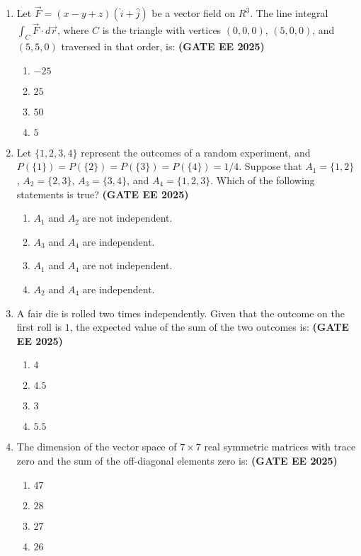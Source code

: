 \documentclass[journal,12pt,onecolumn]{IEEEtran}
\theoremstyle{remark}
\begin{document}
\begin{enumerate}
\item Let $\vec{F} = (x - y + z)(\hat{i} + \hat{j})$ be a vector field on  ${R}^3$. The line integral $\displaystyle \int_C \vec{F} \cdot d\vec{r}$, where $C$ is the triangle with vertices $(0,0,0)$, $(5,0,0)$, and $(5,5,0)$ traversed in that order, is:
\hfill \textbf{(GATE EE 2025)}\\
\begin{enumerate} 
    \item $-25$
    \item $25$
    \item $50$
    \item $5$
\end{enumerate}


\item Let $\{1,2,3,4\}$ represent the outcomes of a random experiment, and $P(\{1\}) = P(\{2\}) = P(\{3\}) = P(\{4\}) = 1/4$. Suppose that $A_1 = \{1,2\}$, $A_2 = \{2,3\}$, $A_3 = \{3,4\}$, and $A_4 = \{1,2,3\}$. Which of the following statements is true?
\hfill \textbf{(GATE EE 2025)}\\

\begin{enumerate} 
    \item $A_1$ and $A_2$ are not independent.
    \item $A_3$ and $A_4$ are independent.
    \item $A_1$ and $A_4$ are not independent.
    \item $A_2$ and $A_4$ are independent.
\end{enumerate}

\item A fair die is rolled two times independently. Given that the outcome on the first roll is $1$, the expected value of the sum of the two outcomes is: \hfill \textbf{(GATE EE 2025)}\\
\begin{enumerate} 
    \item $4$
    \item $4.5$
    \item $3$
    \item $5.5$
\end{enumerate}


\item The dimension of the vector space of $7 \times 7$ real symmetric matrices with trace zero and the sum of the off-diagonal elements zero is: \hfill \textbf{(GATE EE 2025)}\\

\begin{enumerate} 
    \item $47$
    \item $28$
    \item $27$
    \item $26$
\end{enumerate}


\end{enumerate}
\end{document}
